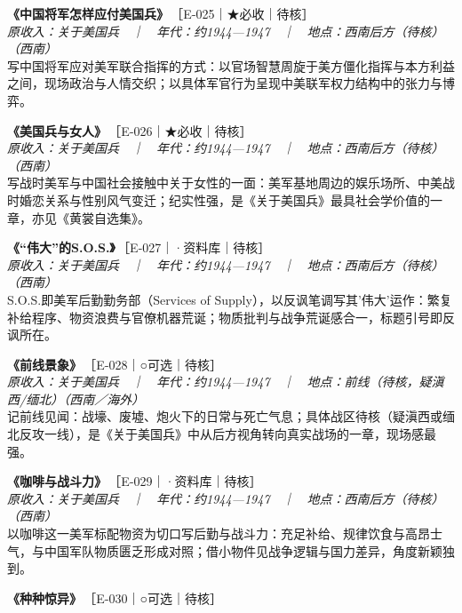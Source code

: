 \documentclass[UTF8,fontset=none,zihao=-4,a4paper]{ctexart}
\begin{document}
\noindent\textbf{《中国将军怎样应付美国兵》}\,{\small ［E-025｜★必收｜待核］}\\
{\small\itshape 原收入：关于美国兵　｜　年代：约1944—1947　｜　地点：西南后方（待核）（西南）}\\
写中国将军应对美军联合指挥的方式：以官场智慧周旋于美方僵化指挥与本方利益之间，现场政治与人情交织；以具体军官行为呈现中美联军权力结构中的张力与博弈。
\par\vspace{5pt}
\noindent\textbf{《美国兵与女人》}\,{\small ［E-026｜★必收｜待核］}\\
{\small\itshape 原收入：关于美国兵　｜　年代：约1944—1947　｜　地点：西南后方（待核）（西南）}\\
写战时美军与中国社会接触中关于女性的一面：美军基地周边的娱乐场所、中美战时婚恋关系与性别风气变迁；纪实性强，是《关于美国兵》最具社会学价值的一章，亦见《黄裳自选集》。
\par\vspace{5pt}
\noindent\textbf{《“伟大”的S.O.S.》}\,{\small ［E-027｜·资料库｜待核］}\\
{\small\itshape 原收入：关于美国兵　｜　年代：约1944—1947　｜　地点：西南后方（待核）（西南）}\\
S.O.S.即美军后勤勤务部（Services of Supply），以反讽笔调写其'伟大'运作：繁复补给程序、物资浪费与官僚机器荒诞；物质批判与战争荒诞感合一，标题引号即反讽所在。
\par\vspace{5pt}
\noindent\textbf{《前线景象》}\,{\small ［E-028｜○可选｜待核］}\\
{\small\itshape 原收入：关于美国兵　｜　年代：约1944—1947　｜　地点：前线（待核，疑滇西/缅北）（西南／海外）}\\
记前线见闻：战壕、废墟、炮火下的日常与死亡气息；具体战区待核（疑滇西或缅北反攻一线），是《关于美国兵》中从后方视角转向真实战场的一章，现场感最强。
\par\vspace{5pt}
\noindent\textbf{《咖啡与战斗力》}\,{\small ［E-029｜·资料库｜待核］}\\
{\small\itshape 原收入：关于美国兵　｜　年代：约1944—1947　｜　地点：西南后方（待核）（西南）}\\
以咖啡这一美军标配物资为切口写后勤与战斗力：充足补给、规律饮食与高昂士气，与中国军队物质匮乏形成对照；借小物件见战争逻辑与国力差异，角度新颖独到。
\par\vspace{5pt}
\noindent\textbf{《种种惊异》}\,{\small ［E-030｜○可选｜待核］}\\
\end{document}
